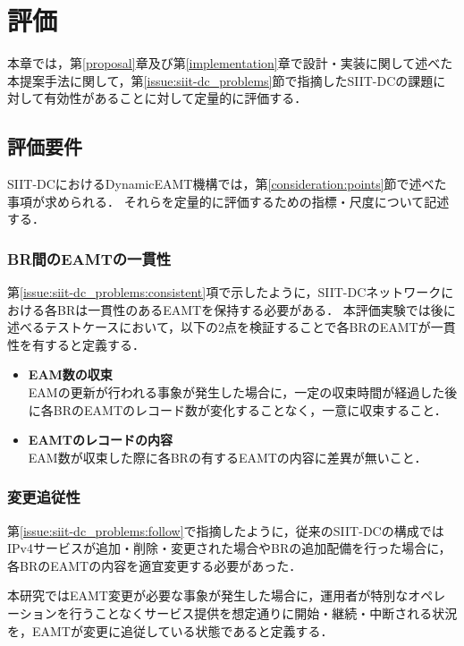 \chapter{評価}
\label{evaluation}
本章では，第\ref{proposal}章及び第\ref{implementation}章で設計・実装に関して述べた本提案手法に関して，第\ref{issue:siit-dc_problems}節で指摘したSIIT-DCの課題に対して有効性があることに対して定量的に評価する．



\section{評価要件}
SIIT-DCにおけるDynamicEAMT機構では，第\ref{consideration:points}節で述べた事項が求められる．
それらを定量的に評価するための指標・尺度について記述する．


\subsection{BR間のEAMTの一貫性}
第\ref{issue:siit-dc_problems:consistent}項で示したように，SIIT-DCネットワークにおける各BRは一貫性のあるEAMTを保持する必要がある．
本評価実験では後に述べるテストケースにおいて，以下の2点を検証することで各BRのEAMTが一貫性を有すると定義する．
\begin{itemize}
    \item \textbf{EAM数の収束} \\
    EAMの更新が行われる事象が発生した場合に，一定の収束時間が経過した後に各BRのEAMTのレコード数が変化することなく，一意に収束すること．
    \item \textbf{EAMTのレコードの内容} \\
    EAM数が収束した際に各BRの有するEAMTの内容に差異が無いこと．
\end{itemize}

\subsection{変更追従性}
第\ref{issue:siit-dc_problems:follow}で指摘したように，従来のSIIT-DCの構成ではIPv4サービスが追加・削除・変更された場合やBRの追加配備を行った場合に，各BRのEAMTの内容を適宜変更する必要があった．

本研究ではEAMT変更が必要な事象が発生した場合に，運用者が特別なオペレーションを行うことなくサービス提供を想定通りに開始・継続・中断される状況を，EAMTが変更に追従している状態であると定義する．

